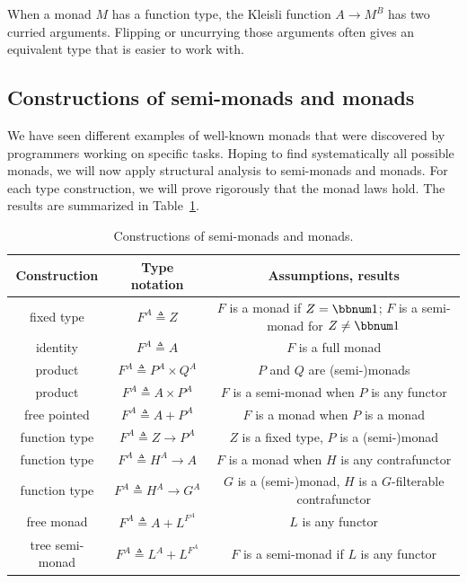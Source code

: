 When a monad $M$ has a function type, the Kleisli function $A\rightarrow M^{B}$
has two curried arguments. Flipping or uncurrying those arguments
often gives an equivalent type that is easier to work with. 

\subsection{Constructions of semi-monads and monads\label{subsec:Structural-analysis-of-monads}}

We have seen different examples of well-known monads that were discovered
by programmers working on specific tasks. Hoping to find systematically
all possible monads, we will now apply structural analysis to semi-monads
and monads. For each type construction, we will prove rigorously that
the monad laws hold. The results are summarized in Table~\ref{tab:Constructions-of-monads}.

\begin{table}
\begin{centering}
\begin{tabular}{|c|c|c|}
\hline 
\textbf{\small{}Construction} & \textbf{\small{}Type notation} & \textbf{\small{}Assumptions, results}\tabularnewline
\hline 
\hline 
{\footnotesize{}fixed type} & {\footnotesize{}$F^{A}\triangleq Z$} & {\footnotesize{}$F$ is a monad if $Z=\bbnum 1$; $F$ is a semi-monad
for $Z\neq\bbnum 1$}\tabularnewline
\hline 
{\footnotesize{}identity} & {\footnotesize{}$F^{A}\triangleq A$} & {\footnotesize{}$F$ is a full monad}\tabularnewline
\hline 
{\footnotesize{}product} & {\footnotesize{}$F^{A}\triangleq P^{A}\times Q^{A}$} & {\footnotesize{}$P$ and $Q$ are (semi-)monads}\tabularnewline
\hline 
{\footnotesize{}product} & {\footnotesize{}$F^{A}\triangleq A\times P^{A}$} & {\footnotesize{}$F$ is a semi-monad when $P$ is any functor}\tabularnewline
\hline 
{\footnotesize{}free pointed} & {\footnotesize{}$F^{A}\triangleq A+P^{A}$} & {\footnotesize{}$F$ is a monad when $P$ is a monad}\tabularnewline
\hline 
{\footnotesize{}function type} & {\footnotesize{}$F^{A}\triangleq Z\rightarrow P^{A}$} & {\footnotesize{}$Z$ is a fixed type, $P$ is a (semi-)monad}\tabularnewline
\hline 
{\footnotesize{}function type} & {\footnotesize{}$F^{A}\triangleq H^{A}\rightarrow A$} & {\footnotesize{}$F$ is a monad when $H$ is any contrafunctor}\tabularnewline
\hline 
{\footnotesize{}function type} & {\footnotesize{}$F^{A}\triangleq H^{A}\rightarrow G^{A}$} & {\footnotesize{}$G$ is a (semi-)monad, $H$ is a $G$-filterable
contrafunctor}\tabularnewline
\hline 
{\footnotesize{}free monad} & {\footnotesize{}$F^{A}\triangleq A+L^{F^{A}}$} & {\footnotesize{}$L$ is any functor}\tabularnewline
\hline 
{\footnotesize{}tree semi-monad} & {\footnotesize{}$F^{A}\triangleq L^{A}+L^{F^{A}}$} & {\footnotesize{}$F$ is a semi-monad if $L$ is any functor}\tabularnewline
\hline 
\end{tabular}
\par\end{centering}
\caption{Constructions of semi-monads and monads.\label{tab:Constructions-of-monads}}
\end{table}


